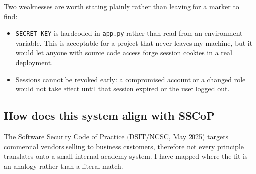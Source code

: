 \documentclass[12pt,a4paper]{article}
\begin{document}
Two weaknesses are worth stating plainly rather than leaving for a marker to find:

\begin{itemize}
    \item \lstinline|SECRET_KEY| is hardcoded in \lstinline|app.py| rather than read from an environment variable. This is acceptable for a project that never leaves my machine, but it would let anyone with source code access forge session cookies in a real deployment.
    \item Sessions cannot be revoked early: a compromised account or a changed role would not take effect until that session expired or the user logged out.
\end{itemize}

\subsection{How does this system align with SSCoP}

The Software Security Code of Practice (DSIT/NCSC, May 2025) targets commercial vendors selling to business customers, therefore not every principle translates onto a small internal academy system. I have mapped where the fit is an analogy rather than a literal match.
\end{document}
